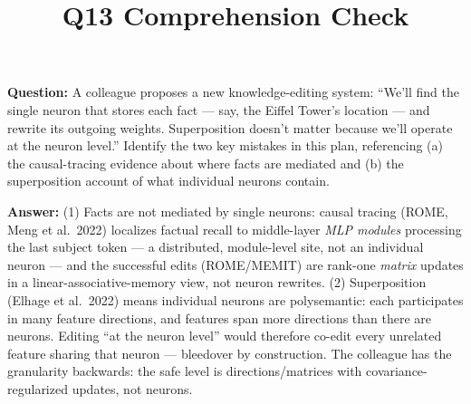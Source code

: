 \documentclass[11pt]{article}
\title{Q13 Comprehension Check}
\date{}
\begin{document}
\maketitle
\textbf{Question:} A colleague proposes a new knowledge-editing system: ``We'll find the single neuron that stores each fact --- say, the Eiffel Tower's location --- and rewrite its outgoing weights. Superposition doesn't matter because we'll operate at the neuron level.'' Identify the two key mistakes in this plan, referencing (a) the causal-tracing evidence about where facts are mediated and (b) the superposition account of what individual neurons contain.

\vspace{1em}
\textbf{Answer:} (1) Facts are not mediated by single neurons: causal tracing (ROME, Meng et al.\ 2022) localizes factual recall to middle-layer \emph{MLP modules} processing the last subject token --- a distributed, module-level site, not an individual neuron --- and the successful edits (ROME/MEMIT) are rank-one \emph{matrix} updates in a linear-associative-memory view, not neuron rewrites. (2) Superposition (Elhage et al.\ 2022) means individual neurons are polysemantic: each participates in many feature directions, and features span more directions than there are neurons. Editing ``at the neuron level'' would therefore co-edit every unrelated feature sharing that neuron --- bleedover by construction. The colleague has the granularity backwards: the safe level is directions/matrices with covariance-regularized updates, not neurons.
\end{document}
